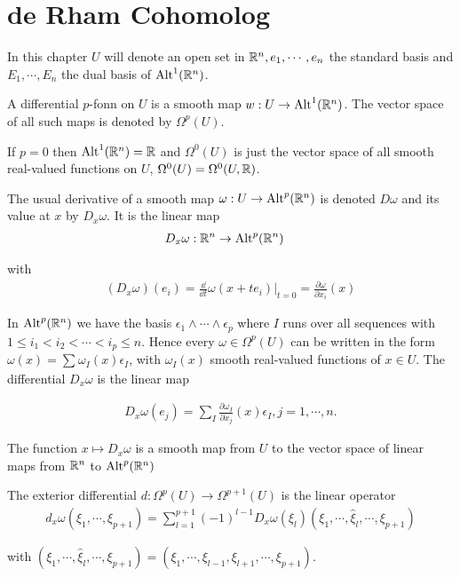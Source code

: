 \chapter{de Rham Cohomolog}
In this chapter $U$ will denote an open set in $\mathbb{R}^n, {e_1,\cdots, e_n}$ the standard basis
and ${E_1, \cdots,E_n}$ the dual basis of $\operatorname{Alt}^1(\mathbb{R}^n)$.

\begin{definition}
  A differential $p$-fonn on $U$ is a smooth map $w:U\to \operatorname{Alt}^1(\mathbb{R}^n)$.
The vector space of all such maps is denoted by $\Omega^p(U)$.
\end{definition}

If $p = 0$ then $\operatorname{Alt}^1(\mathbb{R}^n) = \mathbb{R}$ and $\Omega^0(U)$ is just the vector space of all smooth
real-valued functions on $U$, $\Omega^0(U) = \Omega^0(U, \mathbb{R})$.

The usual derivative of a smooth map $\omega:U\to\operatorname{Alt}^p(\mathbb{R}^n)$ is denoted $D\omega$ and its
value at $x$ by $D_x\omega$. It is the linear map
\begin{align*}
  D_x\omega:\mathbb{R}^n &\to \operatorname{Alt}^p(\mathbb{R}^n)
\end{align*}

with 
\begin{align*}
  (D_x\omega)(e_i) 
  = \frac{\dd }{\dd t}\omega(x+te_i)\Big|_{t=0}
  = \frac{\partial \omega}{\partial x_i}(x)
\end{align*}

In $\operatorname{Alt}^p(\mathbb{R}^n)$ we have the basis $\epsilon_1\wedge\cdots\wedge\epsilon_p$ where 
$I$ runs over all sequences with $1\le i_1<i_2<\cdots<i_p\le n$. Hence every $\omega\in\Omega^p(U)$ 
can be written in the form $\omega(x) = \sum_{}^{}{\omega_I(x)\epsilon_I}$, with $\omega_I(x)$ smooth 
real-valued functions of $x\in U$. The differential $D_x\omega$ is the linear map

\begin{align}\label{eq:3-1}
  D_{x}\omega(e_{j})=\sum_{I}\frac{\partial\omega_{I}}{\partial x_{j}}(x)\epsilon_{I} , j=1,\cdots,n.
\end{align}

The function $x\mapsto D_x\omega$ is a smooth map from $U$ to the vector space of linear
maps from $\mathbb{R}^n$ to $\operatorname{Alt}^p(\mathbb{R}^n)$


\begin{definition}\label{def:3-2}
  The exterior differential $d:\Omega^p(U)\to \Omega^{p+1}(U)$ is the linear operator
  \begin{align*}
    d_x\omega(\xi_1,\cdots,\xi_{p+1})
    = \sum_{l=1}^{p+1}\left(-1\right)^{l-1}D_x\omega(\xi_l)(\xi_1,\cdots,\hat{\xi}_l,\cdots,\xi_{p+1})
  \end{align*}

  with $(\xi_1,\cdots,\hat{\xi}_l,\cdots,\xi_{p+1}) = (\xi_1, \cdots, \xi_{l-1}, \xi_{l+1}, \cdots, \xi_{p+1})$.
\end{definition}



